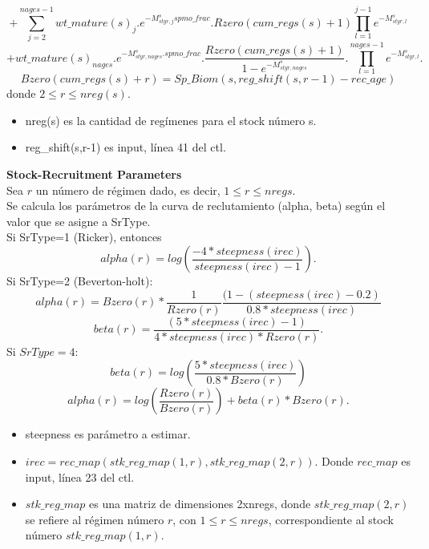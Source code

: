 \documentclass{article}
\begin{document}
\begin{equation*}
    +\sum_{j=2}^{nages-1}wt\_mature(s)_j.e^{-M^s_{styr,j} spmo\_frac}.Rzero(cum\_regs(s)+1)\prod_{l=1}^{j-1}e^{-M^s_{styr,l}} 
\end{equation*}
\begin{equation*}
    + wt\_mature(s)_{nages}.e^{-M^s_{styr,nages}.spmo\_frac}.\dfrac{Rzero(cum\_regs(s)+1)}{1-e^{-M^s_{styr,nages}}}.\prod_{l=1}^{nages-1}e^{-M^s_{styr,l}}.
\end{equation*}
\begin{equation}
    Bzero(cum\_regs(s)+r) = Sp\_Biom(s,reg\_shift(s,r-1)-rec\_age)
\end{equation}
donde $2\leq r \leq nreg(s)$.
\begin{itemize}
    \item nreg(s) es la cantidad de regímenes para el stock número s.
    \item reg\_shift(s,r-1) es input, línea 41 del ctl.
\end{itemize}
\textbf{Stock-Recruitment Parameters}\\
Sea $r$ un número de régimen dado, es decir, $1\leq r \leq nregs$.\\
Se calcula los parámetros de la curva de reclutamiento (alpha, beta) según el valor que se asigne a SrType.\\
Si SrType=1 (Ricker), entonces
\begin{equation}
alpha(r)=log\left(\dfrac{-4*steepness(irec)}{steepness(irec)-1}\right).
\end{equation}
Si SrType=2 (Beverton-holt):
\begin{equation}
    alpha(r) = Bzero(r)*\dfrac{1}{Rzero(r)}\dfrac{(1-(steepness(irec)-0.2)}{0.8*steepness(irec)}
\end{equation}
\begin{equation}
    beta(r)=\dfrac{(5*steepness(irec)-1)}{4*steepness(irec)*Rzero(r)}.
\end{equation}
Si $SrType=4$:
\begin{equation}
    beta(r)=log\left(\dfrac{5*steepness(irec)}{0.8*Bzero(r)}\right)
\end{equation}
\begin{equation}
    alpha(r)=log\left(\dfrac{Rzero(r)}{Bzero(r)}\right)+beta(r)*Bzero(r).
\end{equation}
\begin{itemize}
    \item steepness es parámetro a estimar.
    \item $irec=rec\_map(stk\_reg\_map(1,r),stk\_reg\_map(2,r))$. Donde $rec\_map$ es input, línea 23 del ctl.
    \item $stk\_reg\_map$ es una matriz de dimensiones 2xnregs, donde $stk\_reg\_map(2,r)$ se refiere al régimen número $r$, con $1\leq r \leq nregs$, correspondiente al stock número $stk\_reg\_map(1,r)$.
\end{itemize}
\end{document}
